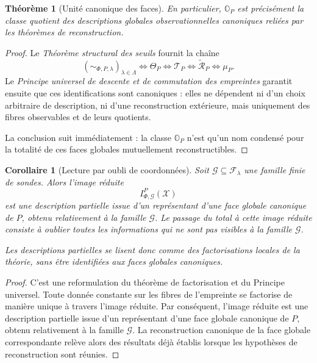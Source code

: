 \documentclass[11pt,a4paper]{article}
\newtheorem{theorem}{Théorème}
\newtheorem{corollary}{Corollaire}
\begin{document}
\begin{appendices}
\begin{theorem}[Unité canonique des faces]
En particulier, \(\mathbb O_P\) est précisément la classe quotient des descriptions globales observationnelles canoniques reliées par les théorèmes de reconstruction.
\end{theorem}

\begin{proof}
Le \emph{Théorème structural des seuils} fournit la chaîne
\[
(\sim_{\Phi,P,\lambda})_{\lambda\in\Lambda}
\Longleftrightarrow
\Theta_P
\Longleftrightarrow
\mathcal T_P
\Longleftrightarrow
\widetilde{\mathcal R}_P
\Longleftrightarrow
\mu_P.
\]
Le \emph{Principe universel de descente et de commutation des empreintes} garantit ensuite que ces identifications sont canoniques : elles ne dépendent ni d'un choix arbitraire de description, ni d'une reconstruction extérieure, mais uniquement des fibres observables et de leurs quotients.

La conclusion suit immédiatement : la classe \(\mathbb O_P\) n'est qu'un nom condensé pour la totalité de ces faces globales mutuellement reconstructibles.
\end{proof}

\begin{corollary}[Lecture par oubli de coordonnées]
Soit \(\mathcal G\subseteq\mathcal F_\lambda\) une famille finie de sondes. Alors l'image réduite
\[
I_{\Phi,\mathcal G}^P(\mathcal X)
\]
est une description partielle issue d'un représentant d'une face globale canonique de \(P\), obtenu relativement à la famille \(\mathcal G\). Le passage du total à cette image réduite consiste à oublier toutes les informations qui ne sont pas visibles à la famille \(\mathcal G\).

Les descriptions partielles se lisent donc comme des factorisations locales de la théorie, sans être identifiées aux faces globales canoniques.
\end{corollary}

\begin{proof}
C'est une reformulation du théorème de factorisation et du Principe universel. Toute donnée constante sur les fibres de l'empreinte se factorise de manière unique à travers l'image réduite. Par conséquent, l'image réduite est une description partielle issue d'un représentant d'une face globale canonique de \(P\), obtenu relativement à la famille \(\mathcal G\). La reconstruction canonique de la face globale correspondante relève alors des résultats déjà établis lorsque les hypothèses de reconstruction sont réunies.
\end{proof}


\end{appendices}
\end{document}
